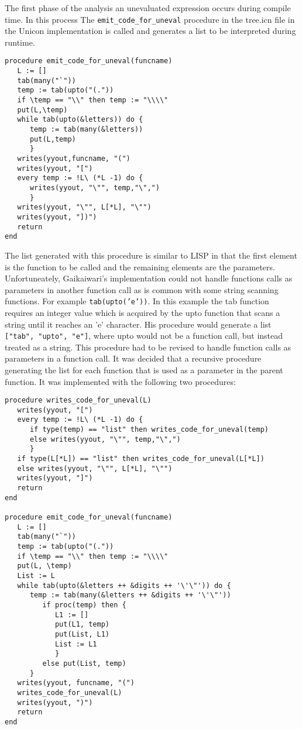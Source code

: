 \documentclass{article}
\begin{document}
The first phase of the analysis an unevaluated expression occurs during compile time.  In this process The \texttt{emit\_code\_for\_uneval} procedure in the tree.icn file in the Unicon implementation is called and generates a list to be interpreted during runtime.
\begin{verbatim}
procedure emit_code_for_uneval(funcname)
   L := []
   tab(many("`"))
   temp := tab(upto("(.")) 
   if \temp == "\\" then temp := "\\\\"
   put(L,\temp)
   while tab(upto(&letters)) do {
      temp := tab(many(&letters))
      put(L,temp)
      }
   writes(yyout,funcname, "(")
   writes(yyout, "[")
   every temp := !L\ (*L -1) do {
      writes(yyout, "\"", temp,"\",")
      }
   writes(yyout, "\"", L[*L], "\"")
   writes(yyout, "])")
   return
end
\end{verbatim}
The list generated with this procedure is similar to LISP in that the first element is the function to be called and the remaining elements are the parameters.  Unfortuneately, Gaikaiwari's implementation could not handle functions calls as parameters in another function call as is common with some string scanning functions.  For example \texttt{tab(upto('e'))}.  In this example the tab function requires an integer value which is acquired by the upto function that scans a string until it reaches an 'e' character.  His procedure would generate a list \texttt{["tab", "upto", "e"]}, where upto would not be a function call, but instead treated as a string.  This procedure had to be revised to handle function calls as parameters in a function call.  It was decided that a recursive procedure generating the list for each function that is used as a parameter in the parent function.  It was implemented with the following two procedures: 
\begin{verbatim}
procedure writes_code_for_uneval(L)
   writes(yyout, "[")
   every temp := !L\ (*L -1) do {
      if type(temp) == "list" then writes_code_for_uneval(temp)
	  else writes(yyout, "\"", temp,"\",")
      }
   if type(L[*L]) == "list" then writes_code_for_uneval(L[*L])
   else writes(yyout, "\"", L[*L], "\"")
   writes(yyout, "]")
   return
end

procedure emit_code_for_uneval(funcname)
   L := []
   tab(many("`"))
   temp := tab(upto("(.")) 
   if \temp == "\\" then temp := "\\\\"
   put(L, \temp)
   List := L
   while tab(upto(&letters ++ &digits ++ '\'\"')) do {
      temp := tab(many(&letters ++ &digits ++ '\'\"'))
         if proc(temp) then {
            L1 := []
            put(L1, temp)
            put(List, L1)
            List := L1
            } 
         else put(List, temp)
      }
   writes(yyout, funcname, "(")
   writes_code_for_uneval(L)
   writes(yyout, ")")
   return
end
\end{verbatim}
\end{document}
